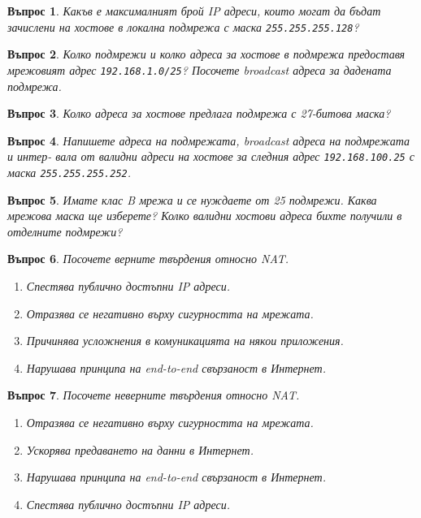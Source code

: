 \documentclass[11pt]{scrartcl}
\newtheorem{q}{Въпрос}
\newenvironment{defractors}{
\begin{enumerate}
  \setlength{\itemsep}{1pt}
  \setlength{\parskip}{0pt}
  \setlength{\parsep}{0pt}
}{\end{enumerate}}
\begin{document}
\begin{q}
  Какъв е максималният брой IP адреси, които могат да бъдат зачислени на хостове
  в локална подмрежа с маска \texttt{255.255.255.128}?
\end{q}

\begin{q}
  Колко подмрежи и колко адреса за хостове в подмрежа предоставя мрежовият
  адрес \texttt{192.168.1.0/25}? Посочете broadcast адреса за дадената подмрежа.
\end{q}

\begin{q}
  Колко адреса за хостове предлага подмрежа с 27-битова маска?
\end{q}

\begin{q}
  Напишете адреса на подмрежата, broadcast адреса на подмрежата и интер- вала от
  валидни адреси на хостове за следния адрес \texttt{192.168.100.25} с маска
  \texttt{255.255.255.252}.
\end{q}

\begin{q}
  Имате клас B мрежа и се нуждаете от 25 подмрежи. Каква мрежова маска ще
  изберете? Колко валидни хостови адреса бихте получили в отделните подмрежи?
\end{q}

\begin{q}
  Посочете верните твърдения относно NAT.

  \begin{defractors}
  \item Спестява публично достъпни IP адреси.
  \item Отразява се негативно върху сигурността на мрежата.
  \item Причинява усложнения в комуникацията на някои приложения.
  \item Нарушава принципа на end-to-end свързаност в Интернет.
  \end{defractors}
\end{q}

\begin{q}
  Посочете неверните твърдения относно NAT.
  \begin{defractors}
  \item Отразява се негативно върху сигурността на мрежата.
  \item Ускорява предаването на данни в Интернет.
  \item Нарушава принципа на end-to-end свързаност в Интернет.
  \item Спестява публично достъпни IP адреси.
  \end{defractors}
\end{q}
\end{document}
